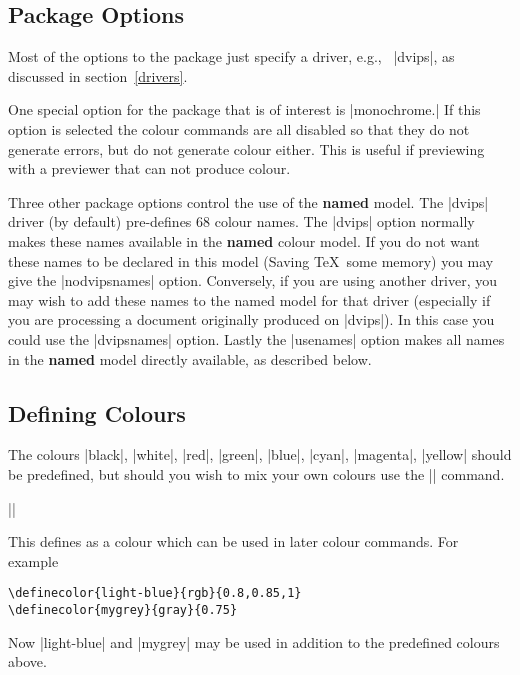 \subsection{Package Options}
Most of the options to the  package just specify a
driver, e.g., \ |dvips|, as discussed in section~\ref{drivers}.

One special option for the  package
that is of interest is |monochrome.|
If this option is selected the colour commands are all
disabled so that they do not generate errors, but do not generate colour
either. This is useful if previewing with a previewer that can not
produce colour.

Three other package options control the use of the \textbf{named} model.
The |dvips| driver (by default) pre-defines 68 colour names. The |dvips|
option normally makes these names available in the \textbf{named} colour
model. If you do not want these names to be declared in  this model
(Saving \TeX\ some memory) you may give the |nodvipsnames|
option. Conversely, if you are using another driver, you may wish to
add these names to the named model for that driver (especially if you
are processing a document originally produced on |dvips|). In this case
you could use the |dvipsnames| option. Lastly the |usenames| option
makes all names in the \textbf{named} model directly available, as
described below.

\subsection{Defining Colours}

The colours |black|, |white|, |red|, |green|, |blue|, |cyan|,
|magenta|, |yellow| should be predefined, but should you wish to mix
your own colours use the |\definecolor| command.

\begin{decl}
|\definecolor|
\end{decl}


This defines  as a colour which can be used in later colour
commands. For example
\begin{verbatim}
\definecolor{light-blue}{rgb}{0.8,0.85,1}
\definecolor{mygrey}{gray}{0.75}
\end{verbatim}

Now |light-blue| and |mygrey| may be used in addition to the
predefined colours above.

